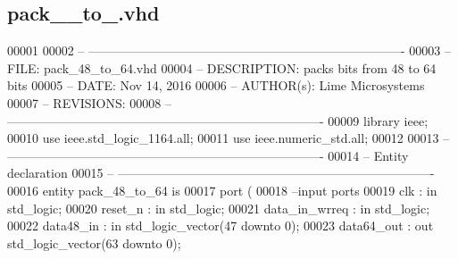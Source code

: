 \subsection{pack\+\_\+\_\+to\+\_.\+vhd}
\label{bit__pack_2synth_2pack__48__to__64_8vhd_source}

\begin{DoxyCode}
00001 
00002 \textcolor{keyword}{-- ---------------------------------------------------------------------------- }
00003 \textcolor{keyword}{-- FILE:    pack\_48\_to\_64.vhd}
00004 \textcolor{keyword}{-- DESCRIPTION: packs bits from 48 to 64 bits}
00005 \textcolor{keyword}{-- DATE:    Nov 14, 2016}
00006 \textcolor{keyword}{-- AUTHOR(s):   Lime Microsystems}
00007 \textcolor{keyword}{-- REVISIONS:}
00008 \textcolor{keyword}{-- ---------------------------------------------------------------------------- }
00009 \textcolor{vhdlkeyword}{library }\textcolor{keywordflow}{ieee};
00010 \textcolor{vhdlkeyword}{use }ieee.std\_logic\_1164.\textcolor{keywordflow}{all};
00011 \textcolor{vhdlkeyword}{use }ieee.numeric\_std.\textcolor{keywordflow}{all};
00012 
00013 \textcolor{keyword}{-- ----------------------------------------------------------------------------}
00014 \textcolor{keyword}{-- Entity declaration}
00015 \textcolor{keyword}{-- ----------------------------------------------------------------------------}
00016 \textcolor{keywordflow}{entity }pack_48_to_64 \textcolor{keywordflow}{is}
00017   \textcolor{keywordflow}{port} \textcolor{vhdlchar}{(}
00018 \textcolor{keyword}{      --input ports }
00019       \textcolor{vhdlchar}{clk}               \textcolor{vhdlchar}{:} \textcolor{keywordflow}{in} \textcolor{comment}{std\_logic};
00020       \textcolor{vhdlchar}{reset_n}           \textcolor{vhdlchar}{:} \textcolor{keywordflow}{in} \textcolor{comment}{std\_logic};
00021         \textcolor{vhdlchar}{data_in_wrreq}   \textcolor{vhdlchar}{:} \textcolor{keywordflow}{in} \textcolor{comment}{std\_logic};
00022         \textcolor{vhdlchar}{data48_in}       \textcolor{vhdlchar}{:} \textcolor{keywordflow}{in} \textcolor{comment}{std\_logic\_vector}\textcolor{vhdlchar}{(}\textcolor{vhdllogic}{}\textcolor{vhdllogic}{47} \textcolor{keywordflow}{downto} \textcolor{vhdllogic}{}\textcolor{vhdllogic}{0}\textcolor{vhdlchar}{)};
00023         \textcolor{vhdlchar}{data64_out}      \textcolor{vhdlchar}{:} \textcolor{keywordflow}{out} \textcolor{comment}{std\_logic\_vector}\textcolor{vhdlchar}{(}\textcolor{vhdllogic}{}\textcolor{vhdllogic}{63} \textcolor{keywordflow}{downto} \textcolor{vhdllogic}{}\textcolor{vhdllogic}{0}\textcolor{vhdlchar}{)};

\end{DoxyCode}
